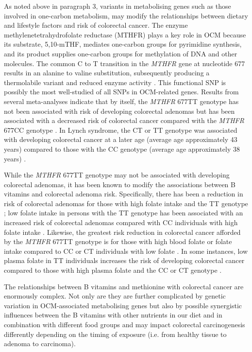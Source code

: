 \noindent As noted above in paragraph 3, variants in metabolising genes such as those involved in one-carbon metabolism, may modify the relationships between dietary and lifestyle factors and risk of colorectal cancer. The enzyme methylenetetrahydrofolate reductase (MTHFR) plays a key role in OCM because its substrate, 5,10-mTHF, mediates one-carbon groups for pyrimidine synthesis, and its product supplies one-carbon groups for methylation of DNA and other molecules. The common C to T transition in the \textit{MTHFR} gene at nucleotide 677 results in an alanine to valine substitution, subsequently producing a thermolabile variant and reduced enzyme activity \cite{c133}. This functional SNP is possibly the most well-studied of all SNPs in OCM-related genes. Results from several meta-analyses indicate that by itself, the \textit{MTHFR} 677TT genotype has not been associated with risk of developing colorectal adenomas \cite{c134,c135} but has been associated with a decreased risk of colorectal cancer compared 
with the \textit{MTHFR} 677CC genotype \cite{c134,c135,c136}. In Lynch syndrome, the CT or TT genotype was associated with developing colorectal cancer at a later age (average age approximately 43 years) compared to those with the CC genotype (average age approximately 38 years) \cite{c137,c138}. 
 
\noindent While the \textit{MTHFR} 677TT genotype may not be associated with developing colorectal adenomas, it has been known to modify the associations between B vitamins and colorectal adenoma risk. Specifically, there has been a reduction in risk of colorectal adenomas for those with high folate intake and the TT genotype \cite{c139,c140,c141}; low folate intake in persons with the TT genotype has been associated with an increased risk of colorectal adenomas compared with CC individuals with high folate intake \cite{c141}. Likewise, the greatest risk reduction in colorectal cancer afforded by the \textit{MTHFR} 677TT genotype is for those with high blood folate or folate intake compared to CC or CT individuals with low folate \cite{c142,c143,c144,c145}. In some instances, low plasma folate in TT individuals increases the risk of developing colorectal cancer compared to those with high plasma folate and the CC or CT genotype \cite{c144}. 
 
\noindent The relationships between B vitamins and methionine with colorectal cancer are enormously complex. Not only are they are further complicated by genetic variation in OCM-associated metabolising genes but also by possible synergistic influences between the B vitamins with other nutrients in our diet and in combination with different food groups and may impact colorectal carcinogenesis differently depending on the timing of exposure (i.e. from healthy tissue to adenoma to carcinoma). 
 
